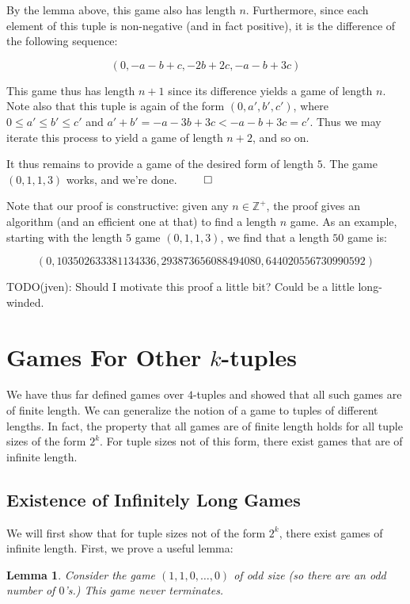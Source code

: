 \documentclass[12pt]{amsart}
\newtheorem{lemma}[theorem]{Lemma}
\newcommand{\zp}{\mathbb{Z}^+}
\begin{document}
By the lemma above, this game also has length $n$. Furthermore, since each element of this tuple is non-negative (and in fact positive), it is the difference of the following sequence:

$$(0, -a - b + c, -2b + 2c, -a - b + 3c)$$

This game thus has length $n + 1$ since its difference yields a game of length $n$. Note also that this tuple is again of the form $(0, a', b', c')$, where $0\leq a'\leq b'\leq c'$ and $a' + b' = -a - 3b + 3c < -a - b + 3c = c'$. Thus we may iterate this process to yield a game of length $n + 2$, and so on.

It thus remains to provide a game of the desired form of length $5$. The game $(0, 1, 1, 3)$ works, and we're done. $\qed$

Note that our proof is constructive: given any $n\in \zp$, the proof gives an algorithm (and an efficient one at that) to find a length $n$ game. As an example, starting with the length $5$ game $(0, 1, 1, 3)$, we find that a length $50$ game is:

$$(0, 103502633381134336, 293873656088494080, 644020556730990592)$$

TODO(jven): Should I motivate this proof a little bit? Could be a little long-winded.

\section{Games For Other $k$-tuples\label{sec:othertuples}}

We have thus far defined games over $4$-tuples and showed that all such games are of finite length. We can generalize the notion of a game to tuples of different lengths. In fact, the property that all games are of finite length holds for all tuple sizes of the form $2^k$. For tuple sizes not of this form, there exist games that are of infinite length.

\subsection{Existence of Infinitely Long Games}

We will first show that for tuple sizes not of the form $2^k$, there exist games of infinite length. First, we prove a useful lemma:

\begin{lemma}
Consider the game $(1, 1, 0, \ldots, 0)$ of odd size (so there are an odd number of $0$'s.) This game never terminates.
\label{lem:evenodds}
\end{lemma}
\end{document}
